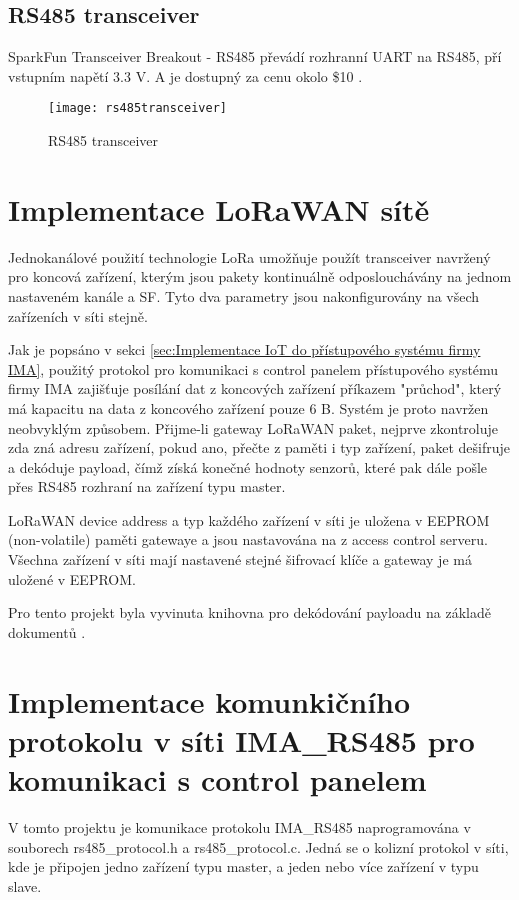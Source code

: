 \subsection{RS485 transceiver}
SparkFun Transceiver Breakout - RS485 převádí rozhranní UART na RS485, pří vstupním napětí 3.3 V. A je dostupný za cenu okolo \$10 \cite{rs485tr}.

\begin{figure}[!h]
    \centering
    \texttt{[image: rs485transceiver]}
    \caption{RS485 transceiver \cite{rs485tr}}
    \label{fig:rs485transceiver}
\end{figure}

\newpage
\section{Implementace LoRaWAN sítě}
Jednokanálové použití technologie LoRa umožňuje použít transceiver navržený pro koncová zařízení, 
kterým jsou pakety kontinuálně odposlouchávány na jednom nastaveném kanále a SF. 
Tyto dva parametry jsou nakonfigurovány na všech zařízeních v síti stejně.

Jak je popsáno v sekci \ref{sec:Implementace IoT do přístupového systému firmy IMA}, 
použitý protokol pro komunikaci s control panelem přístupového systému firmy IMA zajišťuje posílání dat z koncových zařízení příkazem "průchod", 
který má kapacitu na data z koncového zařízení pouze 6 B. 
Systém je proto navržen neobvyklým způsobem. 
Přijme-li gateway LoRaWAN paket, nejprve zkontroluje zda zná adresu zařízení, pokud ano, přečte z paměti i typ zařízení,
 paket dešifruje a dekóduje payload, čímž získá konečné hodnoty senzorů, které pak dále pošle přes RS485 rozhraní na zařízení typu master.

LoRaWAN device address a typ každého zařízení v síti je uložena v EEPROM (non-volatile) paměti gatewaye a jsou nastavována na z access control serveru.
Všechna zařízení v síti mají nastavené stejné šifrovací klíče a gateway je má uložené v EEPROM.

Pro tento projekt byla vyvinuta knihovna pro dekódování payloadu na základě dokumentů \cite{lwSpec} \cite{lwSecur}.


\section{Implementace komunkičního protokolu v síti IMA\_RS485 pro komunikaci s control panelem}
V tomto projektu je komunikace protokolu IMA\_RS485 naprogramována v souborech rs485\_protocol.h a rs485\_protocol.c. 
Jedná se o kolizní protokol v síti, kde je připojen jedno zařízení typu master, a jeden nebo více zařízení v typu slave.

